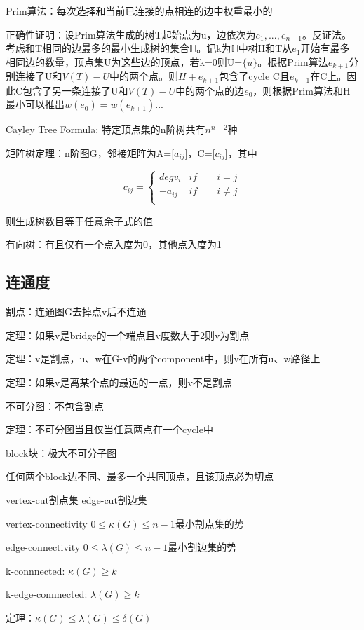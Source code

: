\documentclass[cn,hazy,blue,screen,14pt]{note}
\begin{document}
Prim算法：每次选择和当前已连接的点相连的边中权重最小的

正确性证明：设Prim算法生成的树T起始点为u，边依次为$e_{1},...,e_{n-1}$。反证法。考虑和T相同的边最多的最小生成树的集合$\mathbb{H}$。记k为$\mathbb{H}$中树H和T从$e_{1}$开始有最多相同边的数量，顶点集U为这些边的顶点，若k=0则U=$\{u\}$。根据Prim算法$e_{k+1}$分别连接了U和$V(T)-U$中的两个点。则$H+e_{k+1}$包含了cycle C且$e_{k+1}$在C上。因此C包含了另一条连接了U和$V(T)-U$中的两个点的边$e_{0}$，则根据Prim算法和H最小可以推出$w(e_{0})=w(e_{k+1})$...

Cayley Tree Formula: 特定顶点集的n阶树共有$n^{n-2}$种

矩阵树定理：n阶图G，邻接矩阵为A=[$a_{ij}$]，C=[$c_{ij}$]，其中

$$c_{ij}=
\left\{
\begin{array}{cc}
deg v_{i}& if\qquad i=j\\
-a_{ij}& if\qquad i\neq j\\

\end{array}
\right.
$$

则生成树数目等于任意余子式的值

有向树：有且仅有一个点入度为0，其他点入度为1

\subsection{连通度}
割点：连通图G去掉点v后不连通

定理：如果v是bridge的一个端点且v度数大于2则v为割点

定理：v是割点，u、w在G-v的两个component中，则v在所有u、w路径上

定理：如果v是离某个点的最远的一点，则v不是割点

不可分图：不包含割点

定理：不可分图当且仅当任意两点在一个cycle中

block块：极大不可分子图

任何两个block边不同、最多一个共同顶点，且该顶点必为切点

vertex-cut割点集  edge-cut割边集

vertex-connectivity $0\leq \kappa(G)\leq n-1$最小割点集的势

edge-connectivity $0\leq \lambda(G)\leq n-1$最小割边集的势

k-connnected: $\kappa(G)\geq k$

k-edge-connnected: $\lambda(G)\geq k$

定理：$\kappa(G)\leq \lambda(G)\leq \delta(G)$
\end{document}
